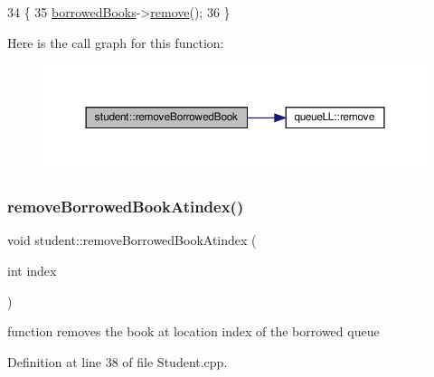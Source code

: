 \begin{DoxyCode}
34                                  \{
35     \hyperlink{classstudent_ab477f6c1525709586ea41364dc8c568b}{borrowedBooks}->\hyperlink{classqueue_l_l_a4204a9db973b69be5824ca2495130b40}{remove}();
36 \}
\end{DoxyCode}
Here is the call graph for this function\+:
\nopagebreak
\begin{figure}[H]
\begin{center}
\leavevmode
\includegraphics[width=350pt]{classstudent_ab98c4cb9d85152c3abd2b5d4255b8271_cgraph}
\end{center}
\end{figure}
\mbox{\label{classstudent_a5387f0131233065383ca141ddec50de6}} 
\subsubsection{\texorpdfstring{remove\+Borrowed\+Book\+Atindex()}{removeBorrowedBookAtindex()}}
{\footnotesize\ttfamily void student\+::remove\+Borrowed\+Book\+Atindex (\begin{DoxyParamCaption}\item[{int}]{index }\end{DoxyParamCaption})}

function removes the book at location index of the borrowed queue 

Definition at line 38 of file Student.\+cpp.



